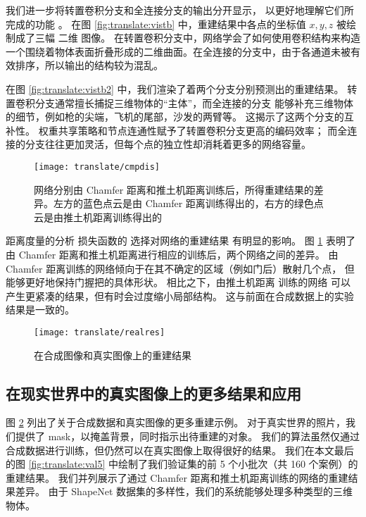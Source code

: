 我们进一步将转置卷积分支和全连接分支的输出分开显示，
以更好地理解它们所完成的功能%
。
在图 \ref{fig:translate:vistb} 中，重建结果中各点的坐标值 $x, y, z$ 被绘制成了三幅 二维 图像。 在转置卷积分支中，网络学会了如何使用卷积结构来构造一个围绕着物体表面折叠形成的二维曲面。在全连接的分支中，由于各通道未被有效排序，所以输出的结构较为混乱。%

在图 \ref{fig:translate:vistb2} 中，我们渲染了着两个分支分别预测出的重建结果。
转置卷积分支通常擅长捕捉三维物体的“主体”，而全连接的分支
能够补充三维物体的细节，例如枪的尖端，飞机的尾部，沙发的两臂等。%
这揭示了这两个分支的互补性。
权重共享策略和节点连通性赋予了转置卷积分支更高的编码效率；%
而全连接的分支往往更加灵活，但每个点的独立性却消耗着更多的网络容量。


\begin{figure}[h]
	\centering
	\texttt{[image: translate/cmpdis]}
	\caption[]{
		网络分别由 Chamfer 距离和推土机距离训练后，所得重建结果的差异。左方的蓝色点云是由 Chamfer 距离训练得出的，右方的绿色点云是由推土机距离训练得出的}
	\label{fig:translate:cmpdis}
\end{figure}

{\heiti 距离度量的分析}
损失函数的%
选择对网络的重建结果%
有明显的影响。
图 \ref{fig:translate:cmpdis} 表明了由 Chamfer 距离和推土机距离进行相应的训练后，两个网络之间的差异。
由 Chamfer 距离训练的网络倾向于在其不确定的区域（例如门后）散射几个点，
但能够更好地保持门握把的具体形状。
相比之下，由推土机距离%
训练的网络
可以
产生更紧凑的结果，但有时会过度缩小局部结构。
这与前面在合成数据上的实验结果是一致的。


\begin{figure}[h]
	\centering
	\texttt{[image: translate/realres]}
	\caption[]{
		在合成图像和真实图像上的重建结果}
	\label{fig:translate:realres}
\end{figure}

\subsection{在现实世界中的真实图像上的更多结果和应用}

图 \ref{fig:translate:realres} 列出了关于合成数据和真实图像的更多重建示例。 对于真实世界的照片，我们提供了 mask，以掩盖背景，同时指示出待重建的对象。 我们的算法虽然仅通过合成数据进行训练，但仍然可以在真实图像上取得很好的结果。
我们在本文最后的图 \ref{fig:translate:val5} 中绘制了我们验证集的前 5 个小批次（共 160 个案例）的重建结果。
我们并列展示了通过 Chamfer 距离和推土机距离训练的网络的重建结果差异。 由于 ShapeNet 数据集的多样性，我们的系统能够处理多种类型的三维物体。

